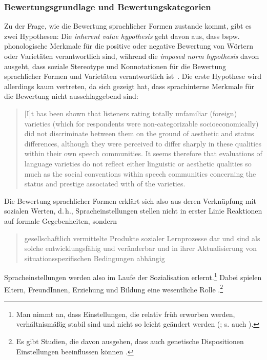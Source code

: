 \subsubsection{Bewertungsgrundlage und Bewertungskategorien}
\label{sec:Bewertungsgrundlage}
Zu der Frage, wie die Bewertung sprachlicher Formen zustande kommt, gibt es zwei Hypothesen: 
Die \textit{inherent value hypothesis} geht davon aus, dass bspw. phonologische Merkmale f{\"u}r die positive oder negative Bewertung von W{\"o}rtern oder Variet{\"a}ten verantwortlich sind, w{\"a}hrend die \textit{imposed norm hypothesis} davon ausgeht, dass soziale Stereotype und Konnotationen f{\"u}r die Bewertung sprachlicher Formen und Variet{\"a}ten verantwortlich ist~\citep[s.][5]{Garrett.2012}. 
Die erste Hypothese wird allerdings kaum vertreten, da sich gezeigt hat, dass sprachinterne Merkmale für die Bewertung nicht ausschlaggebend sind: 
\begin{quote}[I]t has been shown that listeners rating totally unfamiliar (foreign) varieties (which for respondents were non-categorizable socioeconomically) did not discriminate between them on the ground of aesthetic and status differences, although they were perceived to differ sharply in these qualities within their own speech communities. It seems therefore that evaluations of language varieties do not reflect either linguistic or aesthetic qualities so much as the social conventions within speech communities concerning the status and prestige associated with  of the varieties.~\citep[585, Hervorhebung im Original]{Giles.1988}\end{quote}
Die Bewertung sprachlicher Formen erklärt sich also aus deren Verknüpfung mit sozialen Werten, d.\,h., Spracheinstellungen stellen nicht in erster Linie Reaktionen auf formale Gegebenheiten, sondern 
\begin{quote}gesellschaftlich vermittelte Produkte sozialer Lernprozesse dar und sind als solche entwicklungsf{\"a}hig und ver{\"a}nderbar und in ihrer Aktualisierung von situationsspezifischen Bedingungen abh{\"a}ngig~\citep[728]{Neuland.1993}\end{quote}
Spracheinstellungen werden also im Laufe der Sozialisation erlernt.\footnote{Man nimmt an, dass Einstellungen, die relativ fr{\"u}h erworben werden, verhältnismäßig stabil sind und nicht so leicht ge{\"a}ndert werden (\citealp[5]{Garrett2003}; s. auch \citealp[30]{Garrett.2012}).}
Dabei spielen Eltern, FreundInnen, Erziehung und Bildung eine wesentliche Rolle \citep[s.][400]{Lasagabaster.2005}.\footnote{Es gibt Studien, die davon ausgehen, dass auch genetische Dispositionen Einstellungen beeinflussen können \citep[s.][400]{Lasagabaster.2005}.} 
